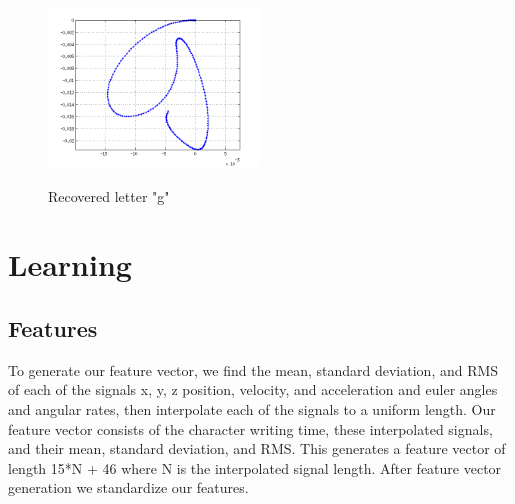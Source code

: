 \documentclass{article}
\begin{document}
\begin{figure}[H]
\centering
    \includegraphics[width=0.5\textwidth, height= 5cm]{g.png}
    \caption{Recovered letter "g"}
\end{figure}



\section{Learning}

\subsection{Features}
To generate our feature vector, we find the mean, standard deviation, and RMS of each of the signals x, y, z position, velocity, and acceleration and euler angles and angular rates, then interpolate each of the signals to a uniform length.  Our feature vector consists of the character writing time, these interpolated signals, and their mean, standard deviation, and RMS.  This generates a feature vector of length 15*N + 46 where N is the interpolated signal length.  After feature vector generation we standardize our features.  
 
\end{document}

